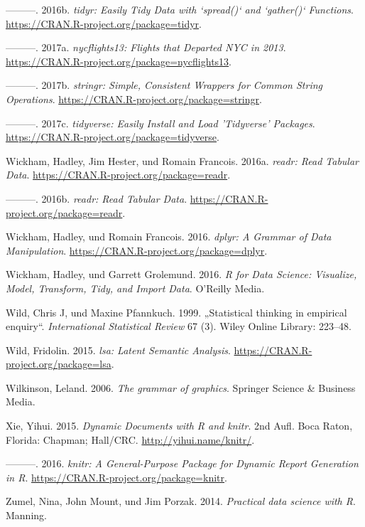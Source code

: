 \documentclass[12pt,ngerman,]{book}
\begin{document}
\hypertarget{ref-R-tidyr}{}
---------. 2016b. \emph{tidyr: Easily Tidy Data with `spread()` and
`gather()` Functions}. \url{https://CRAN.R-project.org/package=tidyr}.

\hypertarget{ref-R-nycflights13}{}
---------. 2017a. \emph{nycflights13: Flights that Departed NYC in
2013}. \url{https://CRAN.R-project.org/package=nycflights13}.

\hypertarget{ref-R-stringr}{}
---------. 2017b. \emph{stringr: Simple, Consistent Wrappers for Common
String Operations}. \url{https://CRAN.R-project.org/package=stringr}.

\hypertarget{ref-R-tidyverse}{}
---------. 2017c. \emph{tidyverse: Easily Install and Load 'Tidyverse'
Packages}. \url{https://CRAN.R-project.org/package=tidyverse}.

\hypertarget{ref-readr}{}
Wickham, Hadley, Jim Hester, und Romain Francois. 2016a. \emph{readr:
Read Tabular Data}. \url{https://CRAN.R-project.org/package=readr}.

\hypertarget{ref-R-readr}{}
---------. 2016b. \emph{readr: Read Tabular Data}.
\url{https://CRAN.R-project.org/package=readr}.

\hypertarget{ref-R-dplyr}{}
Wickham, Hadley, und Romain Francois. 2016. \emph{dplyr: A Grammar of
Data Manipulation}. \url{https://CRAN.R-project.org/package=dplyr}.

\hypertarget{ref-r4ds}{}
Wickham, Hadley, und Garrett Grolemund. 2016. \emph{R for Data Science:
Visualize, Model, Transform, Tidy, and Import Data}. O'Reilly Media.

\hypertarget{ref-wild1999statistical}{}
Wild, Chris J, und Maxine Pfannkuch. 1999. „Statistical thinking in
empirical enquiry``. \emph{International Statistical Review} 67 (3).
Wiley Online Library: 223--48.

\hypertarget{ref-R-lsa}{}
Wild, Fridolin. 2015. \emph{lsa: Latent Semantic Analysis}.
\url{https://CRAN.R-project.org/package=lsa}.

\hypertarget{ref-wilkinson2006grammar}{}
Wilkinson, Leland. 2006. \emph{The grammar of graphics}. Springer
Science \& Business Media.

\hypertarget{ref-xie2015}{}
Xie, Yihui. 2015. \emph{Dynamic Documents with R and knitr}. 2nd Aufl.
Boca Raton, Florida: Chapman; Hall/CRC. \url{http://yihui.name/knitr/}.

\hypertarget{ref-R-knitr}{}
---------. 2016. \emph{knitr: A General-Purpose Package for Dynamic
Report Generation in R}. \url{https://CRAN.R-project.org/package=knitr}.

\hypertarget{ref-zumel2014practical}{}
Zumel, Nina, John Mount, und Jim Porzak. 2014. \emph{Practical data
science with R}. Manning.

\printindex
\end{document}
